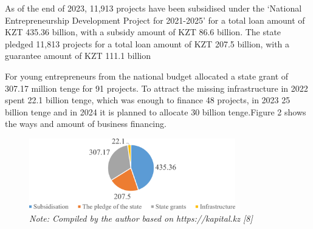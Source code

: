 \begin{multicols}{2}
As of the end of 2023, 11,913 projects have been subsidised under the
`National Entrepreneurship Development Project for 2021-2025' for a
total loan amount of KZT 435.36 billion, with a subsidy amount of KZT
86.6 billion. The state pledged 11,813 projects for a total loan amount
of KZT 207.5 billion, with a guarantee amount of KZT 111.1 billion

For young entrepreneurs from the national budget allocated a state grant
of 307.17 million tenge for 91 projects. To attract the missing
infrastructure in 2022 spent 22.1 billion tenge, which was enough to
finance 48 projects, in 2023 25 billion tenge and in 2024 it is planned
to allocate 30 billion tenge.Figure 2 shows the ways and amount of
business financing.
\end{multicols}

\begin{figure}[H]
	\centering
	\includegraphics[width=0.8\textwidth]{media/ekon/Graph_2}
	\caption*{Fig. 2 - Methods and volume of entrepreneurship financing under the `National Entrepreneurship Development Project for 2021-2025'}
	\caption*{\normalfont \emph{Note: Compiled by the author based on https://kapital.kz {[}8{]}}}
\end{figure}

